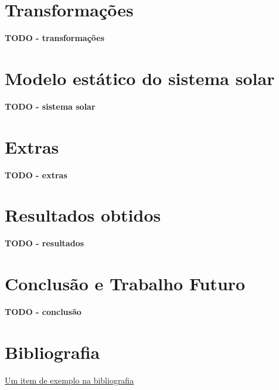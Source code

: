 \documentclass[12pt, a4paper]{article}
\begin{document}
\section{Transformações}

\textbf{\color{red} TODO - transformações}

\section{Modelo estático do sistema solar}

\textbf{\color{red} TODO - sistema solar}

\section{Extras}

\textbf{\color{red} TODO - extras}

\section{Resultados obtidos}

\textbf{\color{red} TODO - resultados}

\section{Conclusão e Trabalho Futuro}

\textbf{\color{red} TODO - conclusão}

\begingroup
\section{Bibliografia}
\renewcommand{\section}[2]{}

\begin{thebibliography}{9}
        \href{https://youtu.be/dQw4w9WgXcQ}{Um item de exemplo na bibliografia}
\end{thebibliography}
\endgroup
\end{document}
